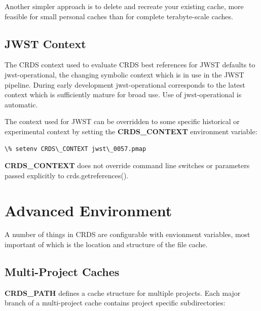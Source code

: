 \documentclass[letterpaper,10pt,english]{sphinxmanual}
\begin{document}
Another simpler approach is to delete and recreate your existing cache, more feasible for small personal caches
than for complete terabyte-scale caches.


\subsection{JWST Context}
\label{installation:jwst-context}
The CRDS context used to evaluate CRDS best references for JWST defaults to jwst-operational,  the changing
symbolic context which is in use in the JWST pipeline.  During early development jwst-operational corresponds
to the latest context which is sufficiently mature for broad use.  Use of jwst-operational is automatic.

The context used for JWST can be overridden to some specific historical or experimental context by setting
the \textbf{CRDS\_CONTEXT} environment variable:

\begin{Verbatim}[commandchars=\\\{\}]
\% setenv CRDS\_CONTEXT jwst\_0057.pmap
\end{Verbatim}

\textbf{CRDS\_CONTEXT} does not override command line switches or parameters passed explicitly to crds.getreferences().


\section{Advanced Environment}
\label{installation:advanced-environment}
A number of things in CRDS are configurable with envionment variables,  most important of which is the
location and structure of the file cache.


\subsection{Multi-Project Caches}
\label{installation:multi-project-caches}
\textbf{CRDS\_PATH} defines a cache structure for multiple projects. Each major branch of a multi-project cache
contains project specific subdirectories:
\end{document}
